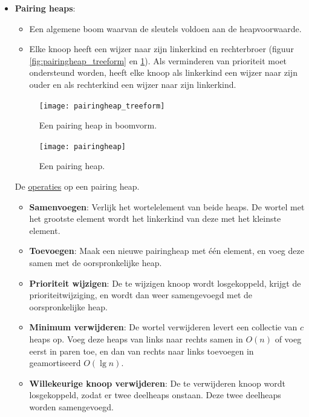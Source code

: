\documentclass{report}
\begin{document}
\begin{itemize}
	\item \textbf{Pairing heaps}:
		\begin{itemize}
			\item Een algemene boom waarvan de sleutels voldoen aan de heapvoorwaarde.
			\item Elke knoop heeft een wijzer naar zijn linkerkind en rechterbroer (figuur \ref{fig:pairingheap_treeform} en \ref{fig:pairingheap}). Als verminderen van prioriteit moet ondersteund worden, heeft elke knoop als linkerkind een wijzer naar zijn ouder en als rechterkind een wijzer naar zijn linkerkind.
		\end{itemize}
		\begin{figure}[ht]
			\centering
			\begin{minipage}{.5\textwidth}
				\centering
				\texttt{[image: pairingheap\_treeform]}
				\caption{Een pairing heap in boomvorm.}
				\label{fig:pairingheap_treeform}
			\end{minipage}%
			\begin{minipage}{.5\textwidth}
				\centering
				\texttt{[image: pairingheap]}
				\caption{Een pairing heap.}
				\label{fig:pairingheap}
			\end{minipage}

	
		\end{figure}

		De \underline{operaties} op een pairing heap.
		\begin{itemize}
			\item \textbf{Samenvoegen}: Verlijk het wortelelement van beide heaps. De wortel met het grootste element wordt het linkerkind van deze met het kleinste element.
			\item \textbf{Toevoegen}: Maak een nieuwe pairingheap met één element, en voeg deze samen met de oorspronkelijke heap.
			\item \textbf{Prioriteit wijzigen}: De te wijzigen knoop wordt losgekoppeld, krijgt de prioriteitwijziging, en wordt dan weer samengevoegd met de oorspronkelijke heap.
			\item \textbf{Minimum verwijderen}: De wortel verwijderen levert een collectie van $c$ heaps op. Voeg deze heaps van links naar rechts samen in $O(n)$ of voeg eerst in paren toe, en dan van rechts naar links toevoegen in geamortiseerd $O(\lg n)$.
			\item \textbf{Willekeurige knoop verwijderen}: De te verwijderen knoop wordt losgekoppeld, zodat er twee deelheaps onstaan. Deze twee deelheaps worden samengevoegd.
		\end{itemize}
\end{itemize}
\end{document}
